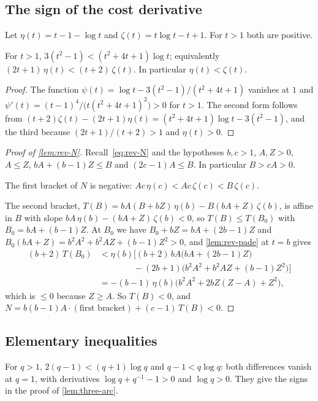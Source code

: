 \subsection{The sign of the cost derivative}\label{app:rev-N}

Let $\eta(t)=t-1-\log t$ and $\zeta(t)=t\log t-t+1$. For $t>1$ both are positive.

\begin{lemma}\label{lem:rev-pade}
For $t>1$, $3(t^2-1)<(t^2+4t+1)\log t$; equivalently $(2t+1)\,\eta(t)<(t+2)\,\zeta(t)$. In
particular $\eta(t)<\zeta(t)$.
\end{lemma}

\begin{proof}
The function $\psi(t)=\log t-3(t^2-1)/(t^2+4t+1)$ vanishes at $1$ and
$\psi'(t)=(t-1)^4/\bigl(t(t^2+4t+1)^2\bigr)>0$ for $t>1$. The second form follows from
$(t+2)\zeta(t)-(2t+1)\eta(t)=(t^2+4t+1)\log t-3(t^2-1)$, and the third because $(2t+1)/(t+2)>1$
and $\eta(t)>0$.
\end{proof}

\begin{proof}[Proof of \cref{lem:rev-N}]
Recall~\eqref{eq:rev-N} and the hypotheses $b,c>1$, $A,Z>0$, $A\le Z$, $bA+(b-1)Z\le B$ and
$(2c-1)A\le B$. In particular $B>cA>0$.

The first bracket of $N$ is negative: $Ac\,\eta(c)<Ac\,\zeta(c)<B\,\zeta(c)$.

The second bracket, $T(B)=bA(B+bZ)\,\eta(b)-B(bA+Z)\,\zeta(b)$, is affine in $B$ with slope
$bA\,\eta(b)-(bA+Z)\,\zeta(b)<0$, so $T(B)\le T(B_0)$ with $B_0=bA+(b-1)Z$. At $B_0$ we have
$B_0+bZ=bA+(2b-1)Z$ and $B_0(bA+Z)=b^2A^2+b^2AZ+(b-1)Z^2>0$, and \cref{lem:rev-pade} at $t=b$ gives
\begin{align*}
  (b+2)\,T(B_0)&<\eta(b)\bigl[(b+2)\,bA\bigl(bA+(2b-1)Z\bigr)\\
  &\qquad\qquad-(2b+1)\bigl(b^2A^2+b^2AZ+(b-1)Z^2\bigr)\bigr]\\
  &=-(b-1)\,\eta(b)\bigl(b^2A^2+2bZ(Z-A)+Z^2\bigr),
\end{align*}
which is $\le0$ because $Z\ge A$. So $T(B)<0$, and
$N=b(b-1)A\cdot(\text{first bracket})+(c-1)\,T(B)<0$.
\end{proof}

\subsection{Elementary inequalities}\label{app:rev-elementary}

 For $q>1$, $2(q-1)<(q+1)\log q$ and $q-1<q\log q$: both differences vanish
at $q=1$, with derivatives
$\log q+q^{-1}-1>0$ and $\log q>0$. They give the signs in the proof of \cref{lem:three-arc}.

